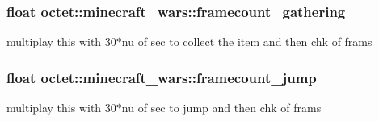 \hypertarget{classoctet_1_1minecraft__wars_a103c8c498e1a7a0bcddf22bb4ea4267f}{
\subsubsection[{framecount\+\_\+gathering}]{\setlength{\rightskip}{0pt plus 5cm}float octet\+::minecraft\+\_\+wars\+::framecount\+\_\+gathering\hspace{0.3cm}{\ttfamily [private]}}}\label{classoctet_1_1minecraft__wars_a103c8c498e1a7a0bcddf22bb4ea4267f}


multiplay this with 30$\ast$nu of sec to collect the item and then chk of frams 

\hypertarget{classoctet_1_1minecraft__wars_a3b1687fe91e29d83e0c854b7ff101104}{
\subsubsection[{framecount\+\_\+jump}]{\setlength{\rightskip}{0pt plus 5cm}float octet\+::minecraft\+\_\+wars\+::framecount\+\_\+jump\hspace{0.3cm}{\ttfamily [private]}}}\label{classoctet_1_1minecraft__wars_a3b1687fe91e29d83e0c854b7ff101104}


multiplay this with 30$\ast$nu of sec to jump and then chk of frams 


